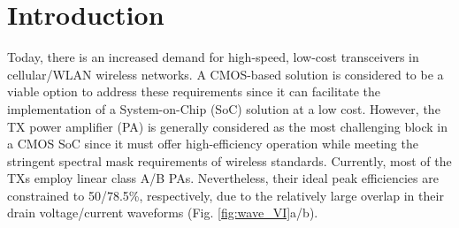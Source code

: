 \documentclass[conference]{IEEEtran}
\begin{document}
\section{Introduction}
Today, there is an increased demand for high-speed, low-cost transceivers in cellular/WLAN wireless networks. A CMOS-based solution is considered to be a viable option to address these requirements since it can facilitate the implementation of a System-on-Chip (SoC) solution at a low cost. However, the TX power amplifier (PA) is generally considered as the most challenging block in a CMOS SoC since it must offer high-efficiency operation while meeting the stringent spectral mask requirements of wireless standards. Currently, most of the TXs employ linear class A/B PAs. Nevertheless, their ideal  peak efficiencies are constrained to 50/78.5\%, respectively, due to the relatively large overlap in their drain voltage/current  waveforms (Fig. \ref{fig:wave_VI}a/b).
\end{document}

